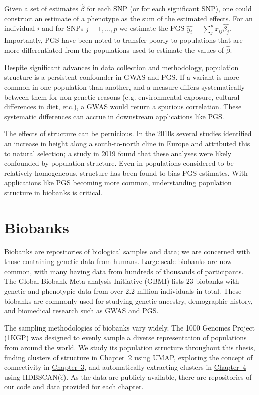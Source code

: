 Given a set of estimates $\hat{\beta}$ for each SNP (or for each significant SNP), one could construct an estimate of a phenotype as the sum of the estimated effects. For an individual $i$ and for SNPs $j = 1, \dots, p$ we estimate the PGS $\hat{y_{i}} = \sum_{j}^{p}x_{ij}\hat{\beta_{j}}$. Importantly, PGS have been noted to transfer poorly to populations that are more differentiated from the populations used to estimate the values of $\hat{\beta}$\citep{wang_theoretical_2020}.

Despite significant advances in data collection and methodology, population structure is a persistent confounder in GWAS and PGS. If a variant is more common in one population than another, and a measure differs systematically between them for non-genetic reasons (e.g. environmental exposure, cultural differences in diet, etc.), a GWAS would return a spurious correlation\citep{price_principal_2006}. These systematic differences can accrue in downstream applications like PGS\citep{zaidi_demographic_2020}. 

The effects of structure can be pernicious. In the 2010s several studies identified an increase in height along a south-to-north cline in Europe and attributed this to natural selection; a study in 2019 found that these analyses were likely confounded by population structure\citep{berg_reduced_2019}. Even in populations considered to be relatively homogeneous, structure has been found to bias PGS estimates\citep{kerminen_geographic_2019}. With applications like PGS becoming more common, understanding population structure in biobanks is critical\citep{kaplan_polygenic_2022}.

\section{Biobanks}

Biobanks are repositories of biological samples and data; we are concerned with those containing genetic data from humans. Large-scale biobanks are now common, with many having data from hundreds of thousands of participants. The Global Biobank Meta-analysis Initiative (GBMI) lists $23$ biobanks with genetic and phenotypic data from over $2.2$ million individuals in total\citep{zhou_global_2022}. These biobanks are commonly used for studying genetic ancestry, demographic history, and biomedical research such as GWAS and PGS.

The sampling methodologies of biobanks vary widely. The 1000 Genomes Project (1KGP)\citep{global_2015} was designed to evenly sample a diverse representation of populations from around the world. We study its population structure throughout this thesis, finding clusters of structure in \hyperref[chap:chapter2]{Chapter~2} using UMAP, exploring the concept of connectivity in \hyperref[chap:chapter3]{Chapter~3}, and automatically extracting clusters in \hyperref[chap:chapter4]{Chapter~4} using HDBSCAN($\hat{\epsilon}$). As the data are publicly available, there are repositories of our code and data provided for each chapter.

